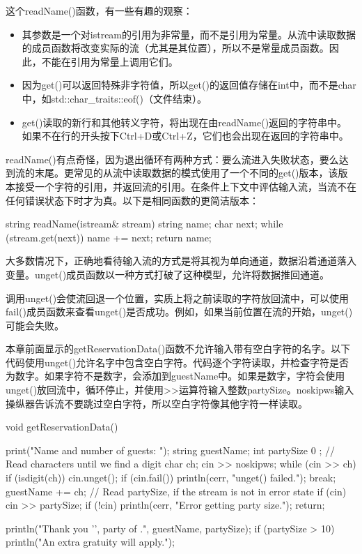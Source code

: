 这个readName()函数，有一些有趣的观察：

\begin{itemize}
\item
其参数是一个对istream的引用为非常量，而不是引用为常量。从流中读取数据的成员函数将改变实际的流（尤其是其位置），所以不是常量成员函数。因此，不能在引用为常量上调用它们。

\item
因为get()可以返回特殊非字符值，所以get()的返回值存储在int中，而不是char中，如std::char\_traits::eof()（文件结束）。

\item
get()读取的新行和其他转义字符，将出现在由readName()返回的字符串中。如果不在行的开头按下Ctrl+D或Ctrl+Z，它们也会出现在返回的字符串中。
\end{itemize}

readName()有点奇怪，因为退出循环有两种方式：要么流进入失败状态，要么达到流的末尾。更常见的从流中读取数据的模式使用了一个不同的get()版本，该版本接受一个字符的引用，并返回流的引用。在条件上下文中评估输入流，当流不在任何错误状态下时才为真。以下是相同函数的更简洁版本：

\begin{cpp}
string readName(istream& stream)
{
    string name;
    char next;
    while (stream.get(next)) {
        name += next;
    }
    return name;
}
\end{cpp}


大多数情况下，正确地看待输入流的方式是将其视为单向通道，数据沿着通道落入变量。unget()成员函数以一种方式打破了这种模型，允许将数据推回通道。

调用unget()会使流回退一个位置，实质上将之前读取的字符放回流中，可以使用fail()成员函数来查看unget()是否成功。例如，如果当前位置在流的开始，unget()可能会失败。

本章前面显示的getReservationData()函数不允许输入带有空白字符的名字。以下代码使用unget()允许名字中包含空白字符。代码逐个字符读取，并检查字符是否为数字。如果字符不是数字，会添加到guestName中。如果是数字，字符会使用unget()放回流中，循环停止，并使用>{}>运算符输入整数partySize。noskipws输入操纵器告诉流不要跳过空白字符，所以空白字符像其他字符一样读取。

\begin{cpp}
void getReservationData()
{
    print("Name and number of guests: ");
    string guestName;
    int partySize { 0 };
    // Read characters until we find a digit
    char ch;
    cin >> noskipws;
    while (cin >> ch) {
        if (isdigit(ch)) {
            cin.unget();
            if (cin.fail()) { println(cerr, "unget() failed."); }
            break;
        }
        guestName += ch;
    }
    // Read partySize, if the stream is not in error state
    if (cin) { cin >> partySize; }
    if (!cin) {
        println(cerr, "Error getting party size.");
        return;
    }

    println("Thank you '{}', party of {}.", guestName, partySize);
    if (partySize > 10) {
        println("An extra gratuity will apply.");
    }
}
\end{cpp}


